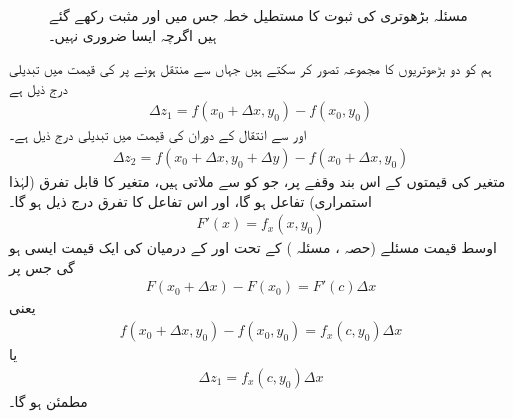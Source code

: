 \begin{figure}
\centering
{}
\caption{
مسئلہ بڑھوتری کی ثبوت  کا مستطیل خطہ  جس میں  اور  مثبت رکھے گئے  ہیں اگرچہ ایسا ضروری نہیں۔
}
\label{شکل_ضمیمہ_بڑھوتری_دو}
\end{figure}


ہم  کو دو بڑھوتریوں کا  مجموعہ   تصور کر سکتے ہیں جہاں   سے   منتقل ہونے  پر   کی قیمت میں تبدیلی درج ذیل ہے
\begin{align*}
\Delta z_1=f(x_0+\Delta x,y_0)-f(x_0,y_0)
\end{align*}
اور  سے  انتقال کے دوران   کی قیمت میں تبدیلی درج ذیل ہے۔
\begin{align*}
\Delta z_2=f(x_0+\Delta x,y_0+\Delta y)-f(x_0+\Delta x,y_0)
\end{align*}
متغیر  کی  قیمتوں  کے اس بند وقفے پر،   جو  کو  سے  ملاتی  ہیں،   متغیر   کا قابل تفرق (لہٰذا استمراری) تفاعل   ہو گا، اور اس  تفاعل کا تفرق درج ذیل ہو گا۔
\begin{align*}
F'(x)=f_x(x,y_0)
\end{align*}
اوسط قیمت مسئلے (حصہ ،  مسئلہ  ) کے تحت   اور  کے درمیان    کی ایک  قیمت  ایسی  ہو گی   جس پر  
\begin{align*}
F(x_0+\Delta x)-F(x_0)=F'(c)\Delta x
\end{align*}
یعنی
\begin{align*}
f(x_0+\Delta x,y_0)-f(x_0,y_0)=f_x(c,y_0)\Delta x
\end{align*}
یا
\begin{align}\label{مساوات_ضمیمہ_یولر_بارہ}
\Delta z_1=f_x(c,y_0)\Delta x
\end{align}
مطمئن ہو گا۔

